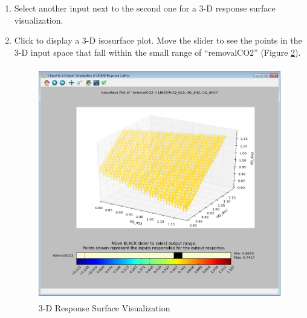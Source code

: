 \begin{enumerate}
{\begin{figure}[H]
\caption{2-D Response Surface Visualization }
\label{fig:uqt_rs2_results}
\end{figure}
}
\item{Select another input next to the second one for a 3-D response surface visualization.}
\item{Click  to display a 3-D isosurface plot. Move the slider to see the points in the 3-D input space that fall within the small range of ``removalCO2'' (Figure \ref{fig:uqt_rs3_results}).
\begin{figure}[H]
\centering \includegraphics[width=6.5in,height=4in,keepaspectratio]{Chapt_uq/figs/tutorial/28_3DRSVis}
\caption{3-D Response Surface Visualization }
\label{fig:uqt_rs3_results}
\end{figure}
}
\end{enumerate}
